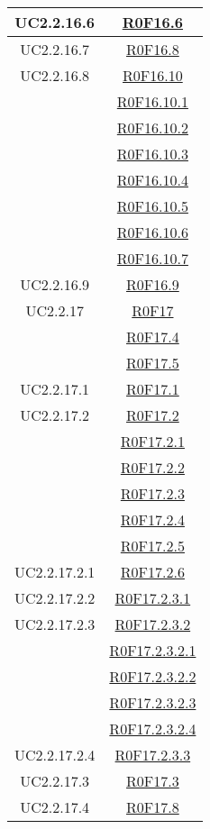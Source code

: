 \documentclass[../AnalisiDeiRequisiti.tex]{subfiles}
\begin{document}
\begin{longtable}{|c|c|}
	UC2.2.16.6 & \hyperlink{R0F16.6}{R0F16.6}\\\hline
	UC2.2.16.7 & \hyperlink{R0F16.8}{R0F16.8}\\\hline
	UC2.2.16.8 & \hyperlink{R0F16.10}{R0F16.10}\\& \hyperlink{R0F16.10.1}{R0F16.10.1}\\& \hyperlink{R0F16.10.2}{R0F16.10.2}\\& \hyperlink{R0F16.10.3}{R0F16.10.3}\\& \hyperlink{R0F16.10.4}{R0F16.10.4}\\& \hyperlink{R0F16.10.5}{R0F16.10.5}\\& \hyperlink{R0F16.10.6}{R0F16.10.6}\\& \hyperlink{R0F16.10.7}{R0F16.10.7}\\\hline
	UC2.2.16.9 & \hyperlink{R0F16.9}{R0F16.9}\\\hline
	UC2.2.17 & \hyperlink{R0F17}{R0F17}\\& \hyperlink{R0F17.4}{R0F17.4}\\& \hyperlink{R0F17.5}{R0F17.5}\\\hline
	UC2.2.17.1 & \hyperlink{R0F17.1}{R0F17.1}\\\hline
	UC2.2.17.2 & \hyperlink{R0F17.2}{R0F17.2}\\& \hyperlink{R0F17.2.1}{R0F17.2.1}\\& \hyperlink{R0F17.2.2}{R0F17.2.2}\\& \hyperlink{R0F17.2.3}{R0F17.2.3}\\& \hyperlink{R0F17.2.4}{R0F17.2.4}\\& \hyperlink{R0F17.2.5}{R0F17.2.5}\\\hline
	UC2.2.17.2.1 & \hyperlink{R0F17.2.6}{R0F17.2.6}\\\hline
	UC2.2.17.2.2 & \hyperlink{R0F17.2.3.1}{R0F17.2.3.1}\\\hline
	UC2.2.17.2.3 & \hyperlink{R0F17.2.3.2}{R0F17.2.3.2}\\& \hyperlink{R0F17.2.3.2.1}{R0F17.2.3.2.1}\\& \hyperlink{R0F17.2.3.2.2}{R0F17.2.3.2.2}\\& \hyperlink{R0F17.2.3.2.3}{R0F17.2.3.2.3}\\& \hyperlink{R0F17.2.3.2.4}{R0F17.2.3.2.4}\\\hline
	UC2.2.17.2.4 & \hyperlink{R0F17.2.3.3}{R0F17.2.3.3}\\\hline
	UC2.2.17.3 & \hyperlink{R0F17.3}{R0F17.3}\\\hline
	UC2.2.17.4 & \hyperlink{R0F17.8}{R0F17.8}\\\hline

\end{longtable}
\end{document}
